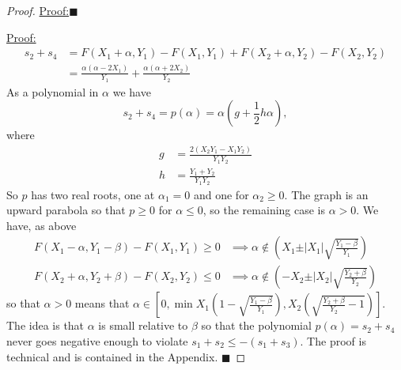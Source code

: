 \documentclass{article}
\theoremstyle{case}
\newenvironment{claim}[1]{\par\noindent\underline{Claim:}\space#1}{}
\newenvironment{claimproof}[1]{\par\noindent\underline{Proof:}\space#1}{\hfill $\blacksquare$}
\begin{document}
\begin{proof}
\begin{claimproof}
\end{claimproof}
\begin{claimproof}
\begin{align*}
s_2 + s_4 & = F(X_1 +\alpha, Y_1) - F(X_1, Y_1) + F(X_2 + \alpha, Y_2) - F(X_2, Y_2) \\
& = \frac{\alpha \left( \alpha - 2X_1\right)}{Y_1} + \frac{\alpha \left( \alpha + 2X_2\right)}{Y_2}
\end{align*}
As a polynomial in $\alpha$ we have
\[
s_2 + s_4 = p(\alpha) = \alpha \left( g + \frac{1}{2}h \alpha \right),
\]
where
\begin{align*}
g & = \frac{2 \left( X_2 Y_1 - X_1 Y_2\right)}{Y_1 Y_2} \\
h & = \frac{Y_1 + Y_2}{Y_1 Y_2}
\end{align*}
So $p$ has two real roots, one at $\alpha_1 = 0$ and one for $\alpha_2 \geq 0$. The graph is an upward parabola so that $p \geq 0$ for $\alpha \leq 0$, so the remaining case is $\alpha > 0$. We have, as above
\begin{align*}
F(X_1-\alpha, Y_1-\beta) - F(X_1, Y_1) \geq 0 & \implies \alpha \not \in \left( X_1 \pm \vert X_1\vert \sqrt{\frac{Y_1-\beta}{Y_1}}\right) \\
F(X_2+\alpha, Y_2+\beta) - F(X_2, Y_2) \leq 0 & \implies \alpha \not \in \left( -X_2 \pm \vert X_2\vert \sqrt{\frac{Y_2 +\beta}{Y_2}} \right)
\end{align*}
so that $\alpha > 0$ means that $\alpha \in \left[ 0, \min{X_1\left( 1 - \sqrt{\frac{Y_1-\beta}{Y_1}}\right), X_2\left( \sqrt{\frac{Y_2 + \beta}{Y_2} - 1} \right)}\right]$. The idea is that $\alpha$ is small relative to $\beta$ so that the polynomial $p(\alpha) = s_2 + s_4$ never goes negative enough to violate $s_1 + s_2 \leq -\left( s_1 + s_3\right)$. The proof is technical and is contained in the Appendix.
\end{claimproof}



\end{proof}
\end{document}
